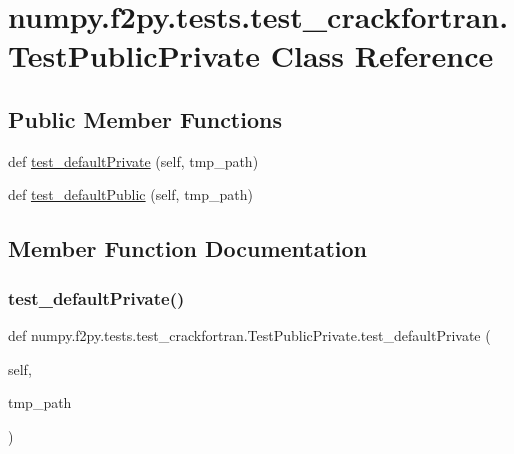 \hypertarget{classnumpy_1_1f2py_1_1tests_1_1test__crackfortran_1_1TestPublicPrivate}{}\section{numpy.\+f2py.\+tests.\+test\+\_\+crackfortran.\+Test\+Public\+Private Class Reference}
\label{classnumpy_1_1f2py_1_1tests_1_1test__crackfortran_1_1TestPublicPrivate}
\subsection*{Public Member Functions}
\begin{DoxyCompactItemize}
\item 
def \hyperlink{classnumpy_1_1f2py_1_1tests_1_1test__crackfortran_1_1TestPublicPrivate_adf80fcd536868a89f92217f779da0570}{test\+\_\+default\+Private} (self, tmp\+\_\+path)
\item 
def \hyperlink{classnumpy_1_1f2py_1_1tests_1_1test__crackfortran_1_1TestPublicPrivate_a10ce9571f403ebfd3b67546d8a0ba7b4}{test\+\_\+default\+Public} (self, tmp\+\_\+path)
\end{DoxyCompactItemize}


\subsection{Member Function Documentation}
\mbox{\label{classnumpy_1_1f2py_1_1tests_1_1test__crackfortran_1_1TestPublicPrivate_adf80fcd536868a89f92217f779da0570}} 
\subsubsection{\texorpdfstring{test\+\_\+default\+Private()}{test\_defaultPrivate()}}
{\footnotesize\ttfamily def numpy.\+f2py.\+tests.\+test\+\_\+crackfortran.\+Test\+Public\+Private.\+test\+\_\+default\+Private (\begin{DoxyParamCaption}\item[{}]{self,  }\item[{}]{tmp\+\_\+path }\end{DoxyParamCaption})}

